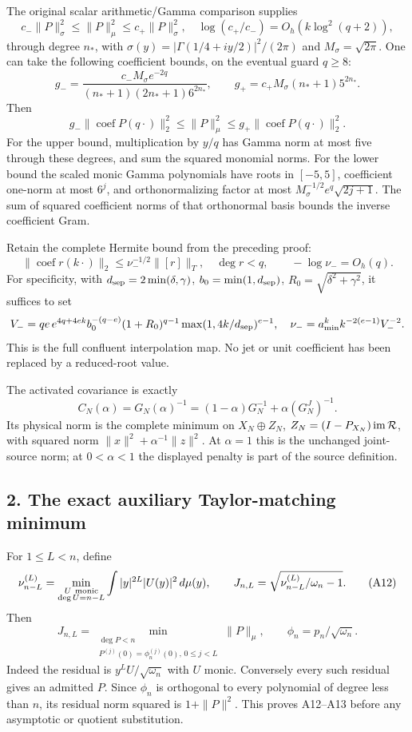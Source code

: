 \documentclass[11pt]{article}
\begin{document}
The original scalar arithmetic/Gamma comparison supplies \[
 c_-\|P\|_\sigma^2\le\|P\|_\mu^2\le c_+\|P\|_\sigma^2,
 \quad
 \log(c_+/c_-)=O_h(k\log^2(q+2)),
 \tag{A8}
\] through degree \(n_*\), with \(\sigma(y)=|\Gamma(1/4+iy/2)|^2/(2\pi)\) and \(M_\sigma=\sqrt{2\pi}\). One can take the following coefficient bounds, on the eventual guard \(q\ge8\): \[
 g_-= \frac{c_-M_\sigma e^{-2q}}
 {(n_*+1)(2n_*+1)6^{2n_*}},\qquad
 g_+=c_+M_\sigma(n_*+1)5^{2n_*}.
 \tag{A9}
\] Then \[
 g_-\|\operatorname{coef}P(q\cdot)\|_2^2
 \le\|P\|_\mu^2
 \le g_+\|\operatorname{coef}P(q\cdot)\|_2^2.
\] For the upper bound, multiplication by \(y/q\) has Gamma norm at most five through these degrees, and sum the squared monomial norms. For the lower bound the scaled monic Gamma polynomials have roots in \([-5,5]\), coefficient one-norm at most \(6^j\), and orthonormalizing factor at most \(M_\sigma^{-1/2}e^q\sqrt{2j+1}\). The sum of squared coefficient norms of that orthonormal basis bounds the inverse coefficient Gram.

Retain the complete Hermite bound from the preceding proof: \[
 \|\operatorname{coef}r(k\cdot)\|_2
 \le\nu_-^{-1/2}\|[r]\|_T,\quad \deg r<q,\qquad
 -\log\nu_-=O_h(q).
 \tag{A10}
\] For specificity, with \(d_{\rm sep}=2\min(\delta,\gamma)\), \(b_0=\min(1,d_{\rm sep})\), \(R_0=\sqrt{\delta^2+\gamma^2}\), it suffices to set \[
 V_-=qe\,e^{4q+4ek}b_0^{-(q-e)}(1+R_0)^{q-1}
          \max(1,4k/d_{\rm sep})^{e-1},\quad
 \nu_-=a_{\min}^k k^{-2(e-1)}V_-^{-2}.
\] This is the full confluent interpolation map. No jet or unit coefficient has been replaced by a reduced-root value.

The activated covariance is exactly \[
 C_N(\alpha)=G_N(\alpha)^{-1}
 =(1-\alpha)G_N^{-1}+\alpha(G_N^J)^{-1}.
 \tag{A11}
\] Its physical norm is the complete minimum on \(X_N\oplus Z_N\), \(Z_N=(I-P_{X_N})\operatorname{im}{\cal R}\), with squared norm \(\|x\|^2+\alpha^{-1}\|z\|^2\). At \(\alpha=1\) this is the unchanged joint-source norm; at \(0<\alpha<1\) the displayed penalty is part of the source definition.

\subsection{2. The exact auxiliary Taylor-matching minimum}\label{the-exact-auxiliary-taylor-matching-minimum}

For \(1\le L<n\), define \[
 \nu_{n-L}^{(L)}
 =\min_{\substack{U\ {\rm monic}\\\deg U=n-L}}
       \int |y|^{2L}|U(y)|^2\,d\mu(y),\qquad
 J_{n,L}=\sqrt{\nu_{n-L}^{(L)}/\omega_n-1}.
 \tag{A12}
\] Then \[
 J_{n,L}
 =\min_{\substack{\deg P<n\\
   P^{(j)}(0)=\phi_n^{(j)}(0),\,0\le j<L}}\|P\|_\mu,
 \qquad \phi_n=p_n/\sqrt{\omega_n}.
 \tag{A13}
\] Indeed the residual is \(y^LU/\sqrt{\omega_n}\) with \(U\) monic. Conversely every such residual gives an admitted \(P\). Since \(\phi_n\) is orthogonal to every polynomial of degree less than \(n\), its residual norm squared is \(1+\|P\|^2\). This proves A12--A13 before any asymptotic or quotient substitution.
\end{document}

